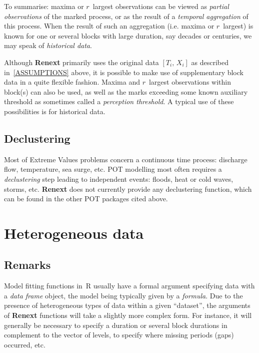 \documentclass[a4paper]{report}
\newcommand{\pkg}[1]{\textbf{#1}}
\begin{document}
To summarise:  maxima or $r$~largest observations can be viewed as
\textit{partial observations}  of the
marked process, or as the result of a \textit{temporal aggregation}
 of this process. When the result of such
an aggregation (i.e.  maxima or $r$~largest) is known for one or
several blocks with large duration, say decades or centuries, we may
speak of \textit{historical data}.  
%

Although \textbf{Renext} primarily uses the original data
$[T_i,\,X_i]$ as described in~\ref{ASSUMPTIONS} above, it is possible
to make use of supplementary block data in a quite flexible
fashion. Maxima and $r$~largest observations within block(s) can also
be used, as well as the marks exceeding some known auxiliary threshold
as sometimes called a \textit{perception threshold}. A typical use of
these possibilities is for historical data.
%
%

\subsection{Declustering}
Most of Extreme Values problems concern a continuous time process:
discharge flow, temperature, sea surge, etc.
POT modelling most often requires a \textit{declustering} step leading to
independent events: floods, heat or cold waves,
storms, etc. \pkg{Renext} does not currently provide any declustering
function, which can be found in the other POT packages cited above. 



\section{Heterogeneous data}
\subsection{Remarks}
Model fitting functions in~R usually have a formal argument specifying
data with a \textit{data frame} object, the model being typically
given by a \textit{formula}. Due to the presence of heterogeneous
types of data within a given ``dataset'', the arguments of
\textbf{Renext} functions will take a slightly more complex form. For
instance, it will generally be necessary to specify a duration or
several block durations in complement to the vector of levels, to specify
where missing periods (gaps) occurred, etc.
\end{document}
